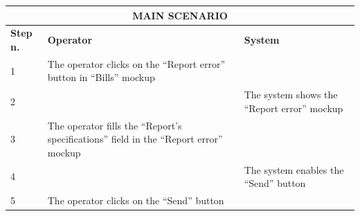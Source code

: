 {{{\begin{center}
			\begin{tabular}{|p{2cm}|p{6cm}|p{6cm}|}
			\hline
				\multicolumn{3}{|c|}{MAIN SCENARIO} \\
			\hline
				\vspace{1mm} \bfseries{Step n.} \vspace{1mm} &
				\vspace{1mm} \bfseries{Operator} \vspace{1mm} & 
				\vspace{1mm} \bfseries{System} \vspace{1mm}\\
			\hline
				\vspace{1mm} 1 \vspace{1mm} &
				\vspace{1mm} The operator clicks on the “Report error” button in “Bills” mockup \vspace{1mm} & 
				\vspace{1mm} \vspace{1mm} \\
			\hline
				\vspace{1mm} 2 \vspace{1mm} &
				\vspace{1mm} \vspace{1mm} & 
				\vspace{1mm} The system shows the “Report error” mockup \vspace{1mm} \\
			\hline
				\vspace{1mm} 3 \vspace{1mm} &
				\vspace{1mm} The operator fills the “Report’s specifications” field in the “Report error”  mockup \vspace{1mm} & 
				\vspace{1mm} \vspace{1mm} \\
			\hline
				\vspace{1mm} 4 \vspace{1mm} &
				\vspace{1mm} \vspace{1mm} & 
				\vspace{1mm} The system enables the “Send” button \vspace{1mm} \\
			\hline
				\vspace{1mm} 5 \vspace{1mm} &
				\vspace{1mm} The operator clicks on the “Send” button \vspace{1mm} & 

\end{tabular}
\end{center}}}}

